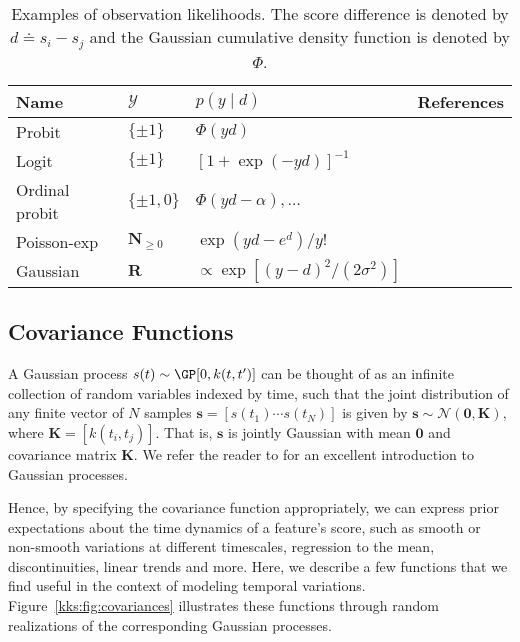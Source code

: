 \begin{table}[t]
	\caption{
		Examples of observation likelihoods.
		The score difference is denoted by $d \doteq s_i - s_j$ and the Gaussian cumulative density function is denoted by $\Phi$.
	}
	\label{kks:tab:likelihoods}
	\centering
	\begin{tabular}{l lll}
		\toprule
		Name           & $\mathcal{Y}$        & $p(y \mid d)$                           & References                                      \\
		\midrule
		Probit         & $\{\pm 1 \}$         & $\Phi(yd)$                              & \citep{thurstone1927law, herbrich2006trueskill} \\
		Logit          & $\{\pm 1 \}$         & $[1 + \exp(-yd)]^{-1}$                  & \citep{zermelo1928berechnung, bradley1952rank}  \\
		Ordinal probit & $\{\pm 1, 0 \}$      & $\Phi(yd - \alpha), \ldots$             & \citep{glenn1960ties}                           \\
		Poisson-exp    & $\mathbf{N}_{\ge 0}$ & $\exp(yd - e^d) / y!$                   & \citep{maher1982modelling}                      \\
		Gaussian       & $\mathbf{R}$         & $\propto \exp[(y - d)^2 / (2\sigma^2)]$ & \citep{guo2012score}                            \\
		\bottomrule
	\end{tabular}
\end{table}


\subsection{Covariance Functions}
\label{kks:sec:covariances}

A Gaussian process $s(t) \sim \GP[0, k(t, t')]$ can be thought of as an infinite collection of random variables indexed by time, such that the joint distribution of any finite vector of $N$ samples $\bm{s} = [s(t_1) \cdots s(t_N)]$ is given by $\bm{s} \sim \mathcal{N}(\bm{0}, \bm{K})$, where $\bm{K} = [k(t_i, t_j)]$.
That is, $\bm{s}$ is jointly Gaussian with mean $\bm{0}$ and covariance matrix $\bm{K}$.
We refer the reader to \citet{rasmussen2006gaussian} for an excellent introduction to Gaussian processes.

Hence, by specifying the covariance function appropriately, we can express prior expectations about the time dynamics of a feature's score, such as smooth or non-smooth variations at different timescales, regression to the mean, discontinuities, linear trends and more.
Here, we describe a few functions that we find useful in the context of modeling temporal variations.
Figure~\ref{kks:fig:covariances} illustrates these functions through random realizations of the corresponding Gaussian processes.

